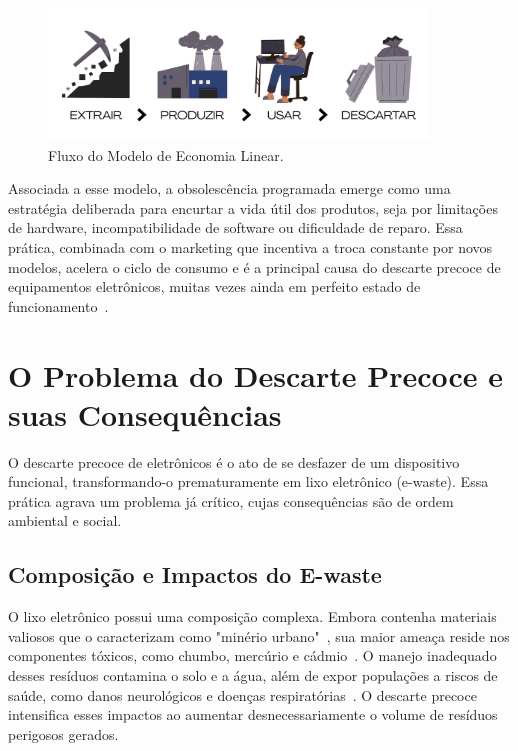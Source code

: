 \documentclass[
	12pt,				%
	openright,			%
	oneside,			%
	a4paper,			%
	english,			%
	brazil				%
	]{abntex2}
\theoremstyle{definition}
\begin{document}
\begin{figure}[H] %
    \centering
    \includegraphics[width=0.9\textwidth]{imagens/economia_linear.png}
    \caption{Fluxo do Modelo de Economia Linear.}
    \label{fig:economia-linear}
\end{figure}

Associada a esse modelo, a obsolescência programada emerge como uma estratégia deliberada para encurtar a vida útil dos produtos, seja por limitações de hardware, incompatibilidade de software ou dificuldade de reparo. Essa prática, combinada com o marketing que incentiva a troca constante por novos modelos, acelera o ciclo de consumo e é a principal causa do descarte precoce de equipamentos eletrônicos, muitas vezes ainda em perfeito estado de funcionamento~\cite{Forti2020}.

\section{O Problema do Descarte Precoce e suas Consequências}

O descarte precoce de eletrônicos é o ato de se desfazer de um dispositivo funcional, transformando-o prematuramente em lixo eletrônico (e-waste). Essa prática agrava um problema já crítico, cujas consequências são de ordem ambiental e social.

\subsection{Composição e Impactos do E-waste}

O lixo eletrônico possui uma composição complexa. Embora contenha materiais valiosos que o caracterizam como "minério urbano"~\cite{Robinson2009}, sua maior ameaça reside nos componentes tóxicos, como chumbo, mercúrio e cádmio~\cite{Widmer2005}. O manejo inadequado desses resíduos contamina o solo e a água, além de expor populações a riscos de saúde, como danos neurológicos e doenças respiratórias~\cite{perkins2014b, Heacock2016}. O descarte precoce intensifica esses impactos ao aumentar desnecessariamente o volume de resíduos perigosos gerados.
\end{document}

